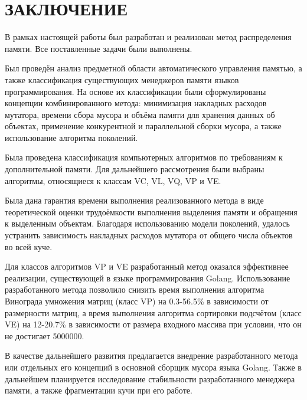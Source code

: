 \part*{ЗАКЛЮЧЕНИЕ}

В рамках настоящей работы был разработан и реализован метод распределения памяти. Все поставленные задачи были выполнены.

Был проведён анализ предметной области автоматического управления памятью, а также классификация существующих менеджеров памяти языков программирования. На основе их классификации были сформулированы концепции комбинированного метода: минимизация накладных расходов мутатора, времени сбора мусора и объёма памяти для хранения данных об объектах, применение конкурентной и параллельной сборки мусора, а также использование алгоритма поколений.

Была проведена классификация компьютерных алгоритмов по требованиям к дополнительной памяти. Для дальнейшего рассмотрения были выбраны алгоритмы, относящиеся к классам VC, VL, VQ, VP и VE.

Была дана гарантия времени выполнения реализованного метода в виде теоретической оценки трудоёмкости выполнения выделения памяти и обращения к выделенным объектам. Благодаря использованию модели поколений, удалось устранить зависимость накладных расходов мутатора от общего числа объектов во всей куче.

Для классов алгоритмов VP и VE разработанный метод оказался эффективнее реализации, существующей в языке программирования Golang. Использование разработанного метода позволило снизить время выполнения алгоритма Винограда умножения матриц (класс VP) на 0.3-56.5\% в зависимости от размерности матриц, а время выполнения алгоритма сортировки подсчётом (класс VE) на 12-20.7\% в зависимости от размера входного массива при условии, что он не достигает 5000000.

В качестве дальнейшего развития предлагается внедрение разработанного метода или отдельных его концепций в основной сборщик мусора языка Golang. Также в дальнейшем планируется исследование стабильности разработанного менеджера памяти, а также фрагментации кучи при его работе.
